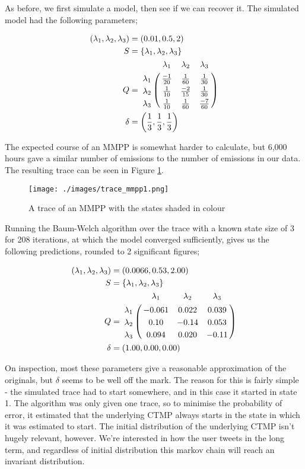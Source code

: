 As before, we first simulate a model, then see if we can recover it. The simulated model had the following parameters;

\begin{align*}
(\lambda_1,\lambda_2,\lambda_3) &= (0.01,0.5,2)\\
S &= \{\lambda_1,\lambda_2,\lambda_3\}\\
Q &= \bordermatrix{      & \lambda_1 & \lambda_2 & \lambda_3\cr
                \lambda_1 & \frac{-1}{20} & \frac{1}{60}  & \frac{1}{30} \cr
                \lambda_2 & \frac{1}{10}  & \frac{-2}{15} & \frac{1}{30} \cr
                \lambda_3 & \frac{1}{10}  & \frac{1}{60}  & \frac{-7}{60}\cr
			}\\
\delta &= \left(\frac{1}{3},\frac{1}{3},\frac{1}{3}\right)
\end{align*}

The expected course of an MMPP is somewhat harder to calculate, but 6,000 hours gave a similar number of emissions to the number of emissions in our data. The resulting trace can be seen in Figure \ref{trace_mmpp1}.

\begin{figure}[h!]
\texttt{[image: ./images/trace\_mmpp1.png]}
\caption{A trace of an MMPP with the states shaded in colour}
\label{trace_mmpp1}
\end{figure}

Running the Baum-Welch algorithm over the trace with a known state size of 3 for 208 iterations, at which the model converged sufficiently, gives us the following predictions, rounded to 2 significant figures;

\begin{align*}
(\lambda_1,\lambda_2,\lambda_3) &= (0.0066,0.53,2.00)\\
S &= \{\lambda_1,\lambda_2,\lambda_3\}\\
Q &= \bordermatrix{      & \lambda_1 & \lambda_2 & \lambda_3\cr
                \lambda_1 & -0.061 & 0.022 & 0.039 \cr
                \lambda_2 & 0.10 & -0.14 & 0.053 \cr
                \lambda_3 & 0.094 & 0.020 & -0.11 \cr
			}\\
\delta &= (1.00,0.00,0.00)
\end{align*}

On inspection, most these parameters give a reasonable approximation of the originals, but $\delta$ seems to be well off the mark. The reason for this is fairly simple - the simulated trace had to start somewhere, and in this case it started in state 1. The algorithm was only given one trace, so to minimise the probability of error, it estimated that the underlying CTMP always starts in the state in which it was estimated to start. The initial distribution of the underlying CTMP isn't hugely relevant, however. We're interested in how the user tweets in the long term, and regardless of initial distribution this markov chain will reach an invariant distribution.

